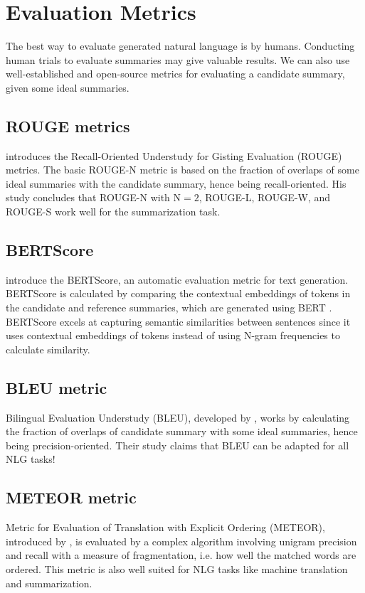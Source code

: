 \section{Evaluation Metrics}

The best way to evaluate generated natural language is by humans.
Conducting human trials to evaluate summaries may give valuable results.
We can also use well-established and open-source metrics for evaluating a candidate
summary, given some ideal summaries.


\subsection{ROUGE metrics}

\citet{lin-2004-rouge} introduces the Recall-Oriented Understudy for Gisting
Evaluation (ROUGE) metrics.
The basic ROUGE-N metric is based on the fraction of overlaps of some ideal summaries
with the candidate summary, hence being recall-oriented.
His study concludes that ROUGE-N with $\text{N}=2$, ROUGE-L, ROUGE-W, and ROUGE-S work
well for the summarization task.


\subsection{BERTScore}

\citet{zhang2019bertscore} introduce the BERTScore, an automatic evaluation metric for
text generation.
BERTScore is calculated by comparing the contextual embeddings of tokens in the candidate
and reference summaries, which are generated using BERT \cite{devlin2018bert}.
BERTScore excels at capturing semantic similarities between sentences since it uses
contextual embeddings of tokens instead of using N-gram frequencies to calculate similarity.


\subsection{BLEU metric}

Bilingual Evaluation Understudy (BLEU), developed by \citet{papineni-etal-2002-bleu},
works by calculating the fraction of overlaps of candidate summary with some ideal
summaries, hence being precision-oriented.
Their study claims that BLEU can be adapted for all NLG tasks!


\subsection{METEOR metric}

Metric for Evaluation of Translation with Explicit Ordering (METEOR), introduced by
\citet{banerjee-lavie-2005-meteor}, is evaluated by a complex algorithm involving
unigram precision and recall with a measure of fragmentation, i.e. how well the matched
words are ordered.
This metric is also well suited for NLG tasks like machine translation and
summarization.
